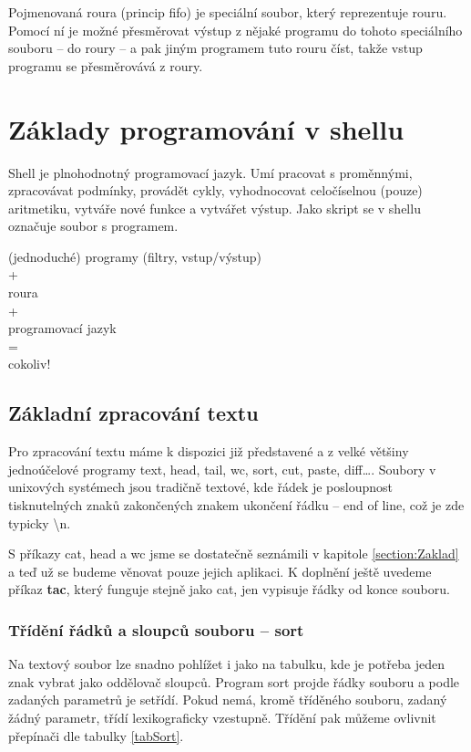 \documentclass{article}
\begin{document}
Pojmenovaná roura (princip fifo) je speciální soubor, který reprezentuje rouru. Pomocí ní je možné přesměrovat výstup z nějaké programu do tohoto speciálního souboru -- do roury -- a pak jiným programem tuto rouru číst, takže vstup programu se přesměrovává z roury.

\section{Základy programování v shellu}
Shell je plnohodnotný programovací jazyk. Umí pracovat s proměnnými, zpracovávat podmínky, provádět cykly, vyhodnocovat celočíselnou (pouze) aritmetiku, vytváře nové funkce a vytvářet výstup. Jako skript se v shellu označuje soubor s programem.

\begin{center}
(jednoduché) programy (filtry, vstup/výstup)\\
+\\
roura\\
+\\
programovací jazyk\\
=\\
cokoliv!
\end{center}
\begin{flushright}
\cite{outrataSlides}
\end{flushright}


\subsection{Základní zpracování textu}
Pro zpracování textu máme k dispozici již představené a z velké většiny jednoúčelové programy text, head, tail, wc, sort, cut, paste, diff\dots. Soubory v unixových systémech jsou tradičně textové, kde řádek je posloupnost tisknutelných znaků zakončených znakem ukončení řádku -- end of line, což je zde typicky \textbackslash n.

S příkazy cat, head a wc jsme se dostatečně seznámili v kapitole \ref{section:Zaklad} a teď už se budeme věnovat pouze jejich aplikaci. K doplnění ještě uvedeme příkaz \textbf{tac}, který funguje stejně jako cat, jen vypisuje řádky od konce souboru.

\subsubsection{Třídění řádků a sloupců souboru -- sort}
Na textový soubor lze snadno pohlížet i jako na tabulku, kde je potřeba jeden znak vybrat jako oddělovač sloupců. Program sort projde řádky souboru a podle zadaných parametrů je setřídí. Pokud nemá, kromě tříděného souboru, zadaný žádný parametr, třídí lexikograficky vzestupně. Třídění pak můžeme ovlivnit přepínači dle tabulky \ref{tabSort}.
\end{document}
